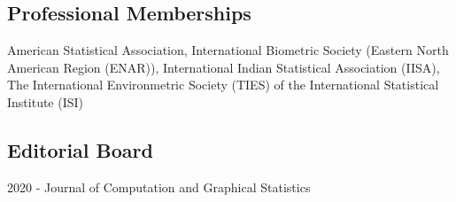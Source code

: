 \documentclass[12pt]{article}
\newcommand{\mydot}[1]{\begin{enumerate}[label=$\circ$,leftmargin=\parindent]\setlength{\itemsep}{#1}}
\newcommand{\ee}{\end{enumerate}}
\newcommand{\mylift}[1]{\vspace*{#1}}
\begin{document}
\subsection*{Professional Memberships}
\vskip -3mm American Statistical Association,  International Biometric Society (Eastern North American Region (ENAR)), International Indian Statistical Association (IISA), The International Environmetric Society (TIES) of the International Statistical Institute (ISI) 

\mylift{-1.5em}
%
%

\subsection*{Editorial Board} \vskip -3mm 2020 - \quad \quad Journal of Computation and Graphical Statistics
\mylift{-1.5em}
\end{document}
